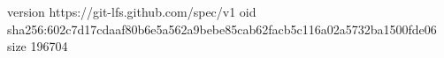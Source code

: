 version https://git-lfs.github.com/spec/v1
oid sha256:602c7d17cdaaf80b6e5a562a9bebe85cab62facb5c116a02a5732ba1500fde06
size 196704
